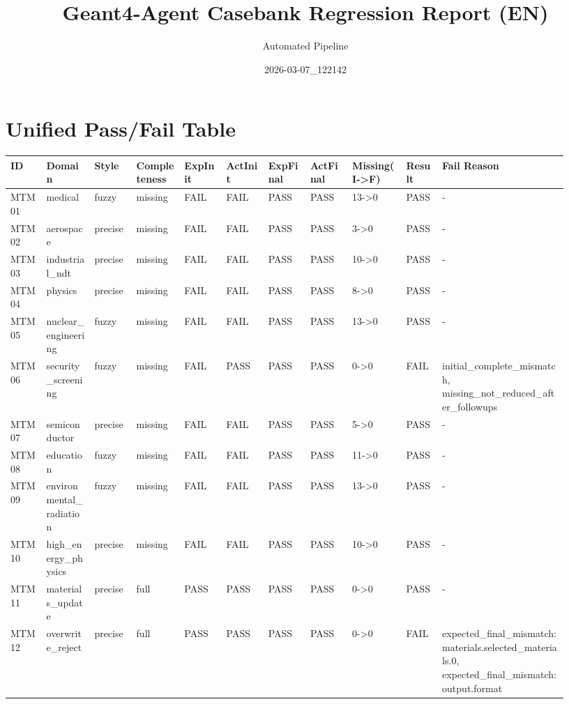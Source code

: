 \documentclass[11pt]{ctexart}
\title{Geant4-Agent Casebank Regression Report (EN)}
\author{Automated Pipeline}
\date{2026-03-07\_122142}
\begin{document}
\maketitle
\section{Unified Pass/Fail Table}
\begin{longtable}{p{0.06\linewidth}p{0.08\linewidth}p{0.07\linewidth}p{0.08\linewidth}p{0.07\linewidth}p{0.07\linewidth}p{0.07\linewidth}p{0.07\linewidth}p{0.09\linewidth}p{0.06\linewidth}p{0.21\linewidth}}
\toprule
ID & Domain & Style & Completeness & ExpInit & ActInit & ExpFinal & ActFinal & Missing(I->F) & Result & Fail Reason \\
\midrule
MTM01 & medical & fuzzy & missing & FAIL & FAIL & PASS & PASS & 13->0 & PASS & - \\
MTM02 & aerospace & precise & missing & FAIL & FAIL & PASS & PASS & 3->0 & PASS & - \\
MTM03 & industrial\_ndt & precise & missing & FAIL & FAIL & PASS & PASS & 10->0 & PASS & - \\
MTM04 & physics & precise & missing & FAIL & FAIL & PASS & PASS & 8->0 & PASS & - \\
MTM05 & nuclear\_engineering & fuzzy & missing & FAIL & FAIL & PASS & PASS & 13->0 & PASS & - \\
MTM06 & security\_screening & fuzzy & missing & FAIL & PASS & PASS & PASS & 0->0 & FAIL & initial\_complete\_mismatch, missing\_not\_reduced\_after\_followups \\
MTM07 & semiconductor & precise & missing & FAIL & FAIL & PASS & PASS & 5->0 & PASS & - \\
MTM08 & education & fuzzy & missing & FAIL & FAIL & PASS & PASS & 11->0 & PASS & - \\
MTM09 & environmental\_radiation & fuzzy & missing & FAIL & FAIL & PASS & PASS & 13->0 & PASS & - \\
MTM10 & high\_energy\_physics & precise & missing & FAIL & FAIL & PASS & PASS & 10->0 & PASS & - \\
MTM11 & materials\_update & precise & full & PASS & PASS & PASS & PASS & 0->0 & PASS & - \\
MTM12 & overwrite\_reject & precise & full & PASS & PASS & PASS & PASS & 0->0 & FAIL & expected\_final\_mismatch:materials.selected\_materials.0, expected\_final\_mismatch:output.format \\
\bottomrule
\end{longtable}
\end{document}
